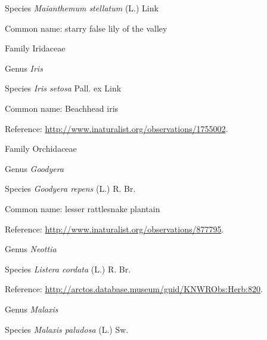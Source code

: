 \documentclass[9pt, article]{memoir}
\begin{document}
\begin{multicols}{2}
\vspace{6pt}\noindent\hspace{36pt}Species \textit{Maianthemum stellatum} (L.) Link


Common name: starry false lily of the valley

\vspace{6pt}\noindent\hspace{24pt}Family Iridaceae


\vspace{6pt}\noindent\hspace{30pt}Genus \textit{Iris}


\vspace{6pt}\noindent\hspace{36pt}Species \textit{Iris setosa} Pall. ex Link


Common name: Beachhead iris

Reference: 
\url{http://www.inaturalist.org/observations/1755002}.

\vspace{6pt}\noindent\hspace{24pt}Family Orchidaceae


\vspace{6pt}\noindent\hspace{30pt}Genus \textit{Goodyera}


\vspace{6pt}\noindent\hspace{36pt}Species \textit{Goodyera repens} (L.) R. Br.


Common name: lesser rattlesnake plantain

Reference: 
\url{http://www.inaturalist.org/observations/877795}.

\vspace{6pt}\noindent\hspace{30pt}Genus \textit{Neottia}


\vspace{6pt}\noindent\hspace{36pt}Species \textit{Listera cordata} (L.) R. Br.


Reference: 
\url{http://arctos.database.museum/guid/KNWRObs:Herb:820}.

\vspace{6pt}\noindent\hspace{30pt}Genus \textit{Malaxis}


\vspace{6pt}\noindent\hspace{36pt}Species \textit{Malaxis paludosa} (L.) Sw.



\end{multicols}
\end{document}
